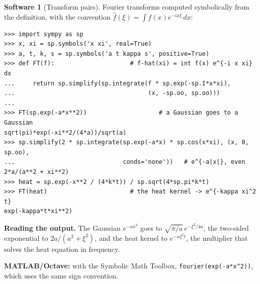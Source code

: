 \documentclass[11pt,a4paper]{article}
\numberwithin{equation}{section}
\theoremstyle{definition}
\newtheorem{software}[thm]{Software}
\begin{document}
\begin{software}[Transform pairs]
\label{sw:transforms}
Fourier transforms computed symbolically from the definition, with the convention $\hat f(\xi) = \int f(x)e^{-ix\xi}\,dx$:
{\small\begin{verbatim}
>>> import sympy as sp
>>> x, xi = sp.symbols('x xi', real=True)
>>> a, t, k, s = sp.symbols('a t kappa s', positive=True)
>>> def FT(f):                     # f-hat(xi) = int f(x) e^{-i x xi} dx
...     return sp.simplify(sp.integrate(f * sp.exp(-sp.I*x*xi),
...                                     (x, -sp.oo, sp.oo)))
...
>>> FT(sp.exp(-a*x**2))                    # a Gaussian goes to a Gaussian
sqrt(pi)*exp(-xi**2/(4*a))/sqrt(a)
>>> sp.simplify(2 * sp.integrate(sp.exp(-a*x) * sp.cos(x*xi), (x, 0, sp.oo),
...                              conds='none'))   # e^{-a|x|}, even
2*a/(a**2 + xi**2)
>>> heat = sp.exp(-x**2 / (4*k*t)) / sp.sqrt(4*sp.pi*k*t)
>>> FT(heat)                       # the heat kernel -> e^{-kappa xi^2 t}
exp(-kappa*t*xi**2)
\end{verbatim}}
\textbf{Reading the output.} The Gaussian $e^{-ax^2}$ goes to $\sqrt{\pi/a}\,e^{-\xi^2/4a}$, the two-sided exponential to $2a/(a^2 + \xi^2)$, and the heat kernel to $e^{-\kappa\xi^2t}$, the multiplier that solves the heat equation in frequency.

\textbf{MATLAB/Octave:} with the Symbolic Math Toolbox, \texttt{fourier(exp(-a*x\^{}2))}, which uses the same sign convention.
\end{software}
\end{document}
